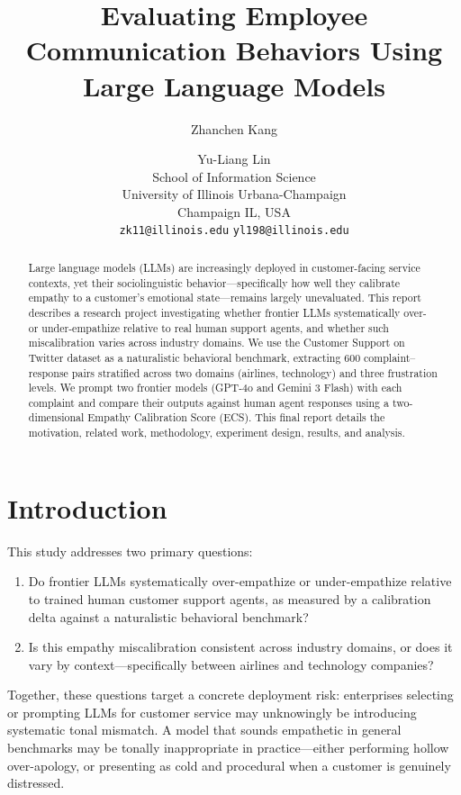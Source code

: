 \documentclass[11pt]{article}
\title{Evaluating Employee Communication Behaviors Using Large Language Models}
\author{Zhanchen Kang \and Yu-Liang Lin  \\
	School of Information Science \\
	University of Illinois Urbana-Champaign \\
	Champaign IL, USA \\
	\texttt{zk11@illinois.edu} \quad \texttt{yl198@illinois.edu}
}
\begin{document}
\maketitle
\begin{abstract}
	Large language models (LLMs) are increasingly deployed in customer-facing service contexts, yet their sociolinguistic behavior---specifically how well they calibrate empathy to a customer's emotional state---remains largely unevaluated. This report describes a research project investigating whether frontier LLMs systematically over- or under-empathize relative to real human support agents, and whether such miscalibration varies across industry domains. We use the Customer Support on Twitter dataset \cite{stuart_axelbrooke_2017} as a naturalistic behavioral benchmark, extracting 600 complaint--response pairs stratified across two domains (airlines, technology) and three frustration levels. We prompt two frontier models (GPT-4o and Gemini 3 Flash) with each complaint and compare their outputs against human agent responses using a two-dimensional Empathy Calibration Score (ECS). This final report details the motivation, related work, methodology, experiment design, results, and analysis.
\end{abstract}


\section{Introduction}


This study addresses two primary questions:

\begin{enumerate}
	\item Do frontier LLMs systematically over-empathize or under-empathize relative to trained human customer support agents, as measured by a calibration delta against a naturalistic behavioral benchmark?
	\item Is this empathy miscalibration consistent across industry domains, or does it vary by context---specifically between airlines and technology companies?
\end{enumerate}

Together, these questions target a concrete deployment risk: enterprises selecting or prompting LLMs for customer service may unknowingly be introducing systematic tonal mismatch. A model that sounds empathetic in general benchmarks may be tonally inappropriate in practice---either performing hollow over-apology, or presenting as cold and procedural when a customer is genuinely distressed.
\end{document}
